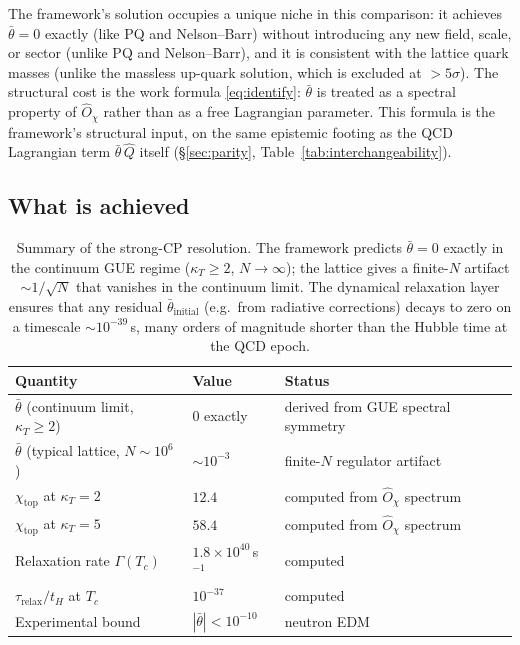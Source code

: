 \documentclass[11pt,a4paper]{article}
\newcommand{\Opchi}{\hat{O}_\chi}
\theoremstyle{plain}
\theoremstyle{definition}
\theoremstyle{remark}
\begin{document}
The framework's solution occupies a unique niche in this comparison:
it achieves $\bar\theta = 0$ exactly (like PQ and Nelson--Barr) without
introducing any new field, scale, or sector (unlike PQ and
Nelson--Barr), and it is consistent with the lattice quark masses
(unlike the massless up-quark solution, which is excluded at
$>5\sigma$).  The structural cost is the work formula
\eqref{eq:identify}: $\bar\theta$ is treated as a spectral property
of $\Opchi$ rather than as a free Lagrangian parameter.  This formula
is the framework's structural input, on the same epistemic footing as
the QCD Lagrangian term $\bar\theta\,\hat Q$ itself
(\S\ref{sec:parity}, Table~\ref{tab:interchangeability}).

\subsection{What is achieved}

\begin{table}[h]
\centering
\small
\begin{tabular}{l l l}
\toprule
Quantity & Value & Status \\
\midrule
$\bar\theta$ (continuum limit, $\kappa_T \ge 2$) & $0$ exactly & derived from GUE spectral symmetry \\
$\bar\theta$ (typical lattice, $N \sim 10^6$)    & $\sim 10^{-3}$ & finite-$N$ regulator artifact \\
$\chi_{\mathrm{top}}$ at $\kappa_T = 2$          & $12.4$  & computed from $\Opchi$ spectrum \\
$\chi_{\mathrm{top}}$ at $\kappa_T = 5$          & $58.4$  & computed from $\Opchi$ spectrum \\
Relaxation rate $\Gamma(T_c)$                    & $1.8 \times 10^{40}\,$s$^{-1}$ & computed \\
$\tau_{\mathrm{relax}} / t_H$ at $T_c$           & $10^{-37}$ & computed \\
Experimental bound                               & $|\bar\theta| < 10^{-10}$ & neutron EDM \\
\bottomrule
\end{tabular}
\caption{Summary of the strong-CP resolution.  The framework predicts
$\bar\theta = 0$ exactly in the continuum GUE regime
($\kappa_T \ge 2$, $N \to \infty$); the lattice gives a finite-$N$
artifact $\sim 1/\sqrt{N}$ that vanishes in the continuum limit.  The
dynamical relaxation layer ensures that any residual
$\bar\theta_{\mathrm{initial}}$ (e.g.\ from radiative corrections)
decays to zero on a timescale $\sim 10^{-39}\,$s, many orders of
magnitude shorter than the Hubble time at the QCD epoch.}
\label{tab:cp-status}
\end{table}
\end{document}
